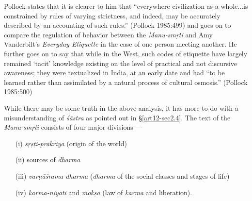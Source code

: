 Pollock states that it is clearer to him that ``everywhere civilization as a whole...is constrained by rules of varying strictness, and indeed, may be accurately described by an accounting of such rules.'' (Pollock 1985:499) and goes on to compare the regulation of behavior between the {\sl Manu-smṛti} and Amy Vanderbilt's {\sl Everyday Etiquette} in the case of one person meeting another. He further goes on to say that while in the West, such codes of etiquette have largely remained `tacit' knowledge existing on the level of practical and not discursive awareness; they were textualized in India, at an early date and had ``to be learned rather than assimilated by a natural process of cultural osmosis.'' (Pollock 1985:500) 

While there may be some truth in the above analysis, it has more to do with a misunderstanding of {\sl śāstra} as pointed out in \S\ref{art12-sec2.4}. The text of the {\sl Manu-smṛti} consists of four major divisions ---
\begin{itemize}
\itemsep=1pt
\item[(i)] {\sl sṛṣṭi-prakriyā} (origin of the world)

\item[(ii)] sources of {\sl dharma}

\item[(iii)] {\sl varṇāśrama-dharma} ({\sl dharma} of the social classes and stages of life)

\item[(iv)] {\sl karma-niyati} and {\sl mokṣa} (law of {\sl karma} and liberation).
\end{itemize}

